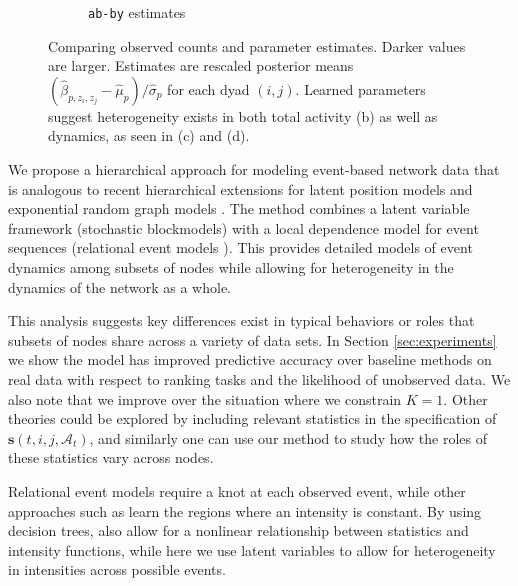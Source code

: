 \begin{figure}[t]
\begin{subfigure}[b]{0.22\textwidth}
\caption{\texttt{ab-by} estimates}
\end{subfigure}
\caption{Comparing observed counts and parameter estimates.  Darker values are larger.  Estimates are rescaled posterior means $(\hat{\beta}_{p,z_i,z_j} - \hat{\mu}_p)/\hat{\sigma}_p$ for each dyad $(i,j)$.  Learned parameters suggest heterogeneity exists in both total activity (b) as well as dynamics, as seen in (c) and (d).}
\label{fig:parmats}
\end{figure}

 We propose a hierarchical approach for modeling event-based network data that is analogous to recent hierarchical extensions for latent position models \cite{Handcock2007} and exponential random graph models \cite{Schweinberger2011}.
The method combines a latent variable framework (stochastic blockmodels) with a local dependence model for event sequences (relational event models \cite{Butts2008}).
This provides detailed models of event dynamics among subsets of nodes while allowing for heterogeneity in the dynamics of the network as a whole.



This analysis suggests key differences exist in typical behaviors or roles that subsets of nodes share across a variety of data sets.
In Section \ref{sec:experiments} we show the model has improved predictive accuracy over baseline methods on real data with respect to ranking tasks and the likelihood of unobserved data.
We also note that we improve over the situation where we constrain $K=1$.
Other theories could be explored by including relevant statistics in the specification of $\mathbf{s}(t,i,j,\mathcal{A}_t)$, and similarly one can use our method to study how the roles of these statistics vary across nodes.


Relational event models \cite{Butts2008} require a knot at each observed event, while other approaches such as \cite{Gunawardana2011} learn the regions where an intensity is constant.
By using decision trees,  \cite{Gunawardana2011} also allow for a nonlinear relationship between statistics and intensity functions, while here we use latent variables to allow for heterogeneity in intensities across possible events.

